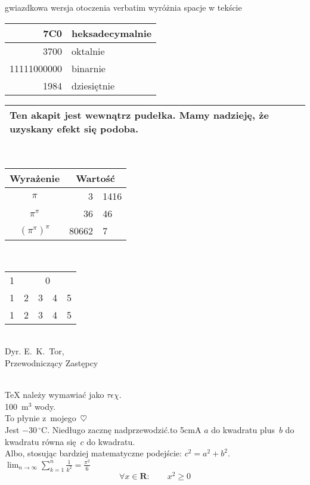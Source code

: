 \documentclass[a4paper]{article}
\begin{document}
\begin{verbatim*}
gwiazdkowa wersja
otoczenia verbatim
wyróżnia spacje
w tekście
\end{verbatim*}
\begin{tabular}{|r|l|} \hline
7C0 & heksadecymalnie \\ \hline
3700 & oktalnie \\ \hline
11111000000 & binarnie \\ \hline \hline
1984 & dziesiętnie \\ \hline
\end{tabular}
\begin{tabular}{|p{4.7cm}|} \hline
Ten akapit jest wewnątrz pudełka. Mamy nadzieję, że uzyskany efekt się podoba.\\ \hline
\end{tabular}\\
\begin{tabular}{c r @{,} l}
Wyrażenie & \multicolumn{2}{c}{Wartość}\\ \hline
$\pi$ & 3 & 1416 \\ \hline
$\pi^{\pi}$ & 36 & 46 \\ \hline
$(\pi^{\pi})^{\pi}$ & 80662 & 7 \\ \hline
\end{tabular}\\
\begin{tabular}{|c|c|c|c|l|} \hline
1 & \multicolumn{4}{c|}{0} \\ \cline{2-5}
1 & 2 & 3 & 4 & 5 \\ \cline{2-4}
1 & 2 & 3 & 4 & 5 \\ \hline
\end{tabular}
\\
Dyr. E.~K.~Tor,\\ Przewodniczący
Zastępcy\\
\date{16 czerwca 1963~r.} 
\\
{\TeX} należy wymawiać jako
$\tau\epsilon\chi$.\\[6pt]
100~m$^{3}$ wody. \\
To płynie z~mojego~$\heartsuit$\\
Jest $-30\,^{\circ}\mathrm{C}$.
Niedługo zacznę nadprzewodzić.\hbox to 5cm{A}
$a$ do kwadratu plus~$b$
do kwadratu równa się~$c$
do kwadratu.\\ Albo, stosując
bardziej matematyczne
podejście: $c^{2}=a^{2}+b^{2}$.\\[6pt]
$\lim_{n \to \infty}
\sum_{k=1}^n \frac{1}{k^2}
= \frac{\pi^2}{6}$\\
\begin{equation}
\forall x \in \mathbf{R}\colon
\qquad x^{2} \geq 0
\end{equation}
\end{document}

